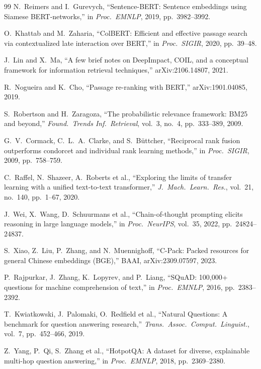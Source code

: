 \documentclass[conference]{IEEEtran}
\begin{document}
\begin{thebibliography}{99}
 N.\ Reimers and I.\ Gurevych, ``Sentence-BERT: Sentence embeddings using Siamese BERT-networks,'' in \emph{Proc.\ EMNLP}, 2019, pp.~3982--3992.

 O.\ Khattab and M.\ Zaharia, ``ColBERT: Efficient and effective passage search via contextualized late interaction over BERT,'' in \emph{Proc.\ SIGIR}, 2020, pp.~39--48.

 J.\ Lin and X.\ Ma, ``A few brief notes on DeepImpact, COIL, and a conceptual framework for information retrieval techniques,'' arXiv:2106.14807, 2021.

 R.\ Nogueira and K.\ Cho, ``Passage re-ranking with BERT,'' arXiv:1901.04085, 2019.

 S.\ Robertson and H.\ Zaragoza, ``The probabilistic relevance framework: BM25 and beyond,'' \emph{Found.\ Trends Inf.\ Retrieval}, vol.~3, no.~4, pp.~333--389, 2009.

 G.\ V.\ Cormack, C.\ L.\ A.\ Clarke, and S.\ B\"uttcher, ``Reciprocal rank fusion outperforms condorcet and individual rank learning methods,'' in \emph{Proc.\ SIGIR}, 2009, pp.~758--759.

 C.\ Raffel, N.\ Shazeer, A.\ Roberts et al., ``Exploring the limits of transfer learning with a unified text-to-text transformer,'' \emph{J.\ Mach.\ Learn.\ Res.}, vol.~21, no.~140, pp.~1--67, 2020.

 J.\ Wei, X.\ Wang, D.\ Schuurmans et al., ``Chain-of-thought prompting elicits reasoning in large language models,'' in \emph{Proc.\ NeurIPS}, vol.~35, 2022, pp.~24824--24837.

 S.\ Xiao, Z.\ Liu, P.\ Zhang, and N.\ Muennighoff, ``C-Pack: Packed resources for general Chinese embeddings (BGE),'' BAAI, arXiv:2309.07597, 2023.

 P.\ Rajpurkar, J.\ Zhang, K.\ Lopyrev, and P.\ Liang, ``SQuAD: 100,000+ questions for machine comprehension of text,'' in \emph{Proc.\ EMNLP}, 2016, pp.~2383--2392.

 T.\ Kwiatkowski, J.\ Palomaki, O.\ Redfield et al., ``Natural Questions: A benchmark for question answering research,'' \emph{Trans.\ Assoc.\ Comput.\ Linguist.}, vol.~7, pp.~452--466, 2019.

 Z.\ Yang, P.\ Qi, S.\ Zhang et al., ``HotpotQA: A dataset for diverse, explainable multi-hop question answering,'' in \emph{Proc.\ EMNLP}, 2018, pp.~2369--2380.


\end{thebibliography}
\end{document}

